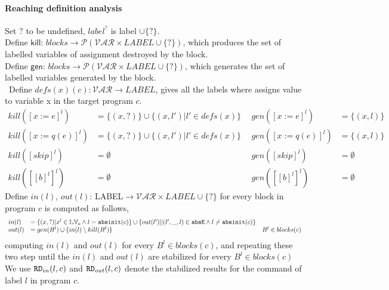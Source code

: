  \paragraph{Reaching definition analysis}
 Set $?$ to be undefined, $label^{?}$ is label $\cup \{?\}$.\\
 Define $\mathsf{kill}$: $blocks \to \mathcal{P}(\mathcal{VAR} \times LABEL \cup \{?\})$, which produces the set of labelled variables of assignment destroyed by the block.
 \\
  Define $\mathsf{gen}$: $blocks \to \mathcal{P}(\mathcal{VAR} \times LABEL \cup \{?\})$, which generates the set of labelled variables generated by the block.
  \\\
  Define $defs(x)(c): \mathcal{VAR} \to LABEL$, gives all the labels where assigns value to variable x in the target program $c$. \[
 \begin{array}{ll}
    kill([x := e]^{l})  & = \{ (x, ?) \} \cup \{ (x, l') | l' \in defs(x) \} \\
     kill([x := q(e)]^{l})  & = \{ (x, ?) \} \cup \{ (x, l') | l' \in defs(x) \}  \\
     kill([skip]^{l})  & = \emptyset \\
     kill([ [b]^l ]^{l})  & =  \emptyset
 \end{array}
 ~~
  \begin{array}{ll}
      gen([x := e]^{l})  & = \{ (x, l) \}  \\
     gen([x := q(e)]^{l})  & = \{ (x, l) \}  \\
     gen([skip]^{l})  & = \emptyset \\
     gen([ [b]^l ]^{l})  & =  \emptyset 
 \end{array}
 \]
 Define $in(l)$, $out(l)$: LABEL$ \to \mathcal{VAR} \times LABEL \cup \{?\}$ for every block in program $c$ is computed as follows,
 \[
 \begin{array}{lll}
    in(l)  & = \{ (x, ?) | x^l \in \mathbb{LV}_c \land  l = \mathtt{abs}{\mathtt{init}}(c) \}  
    \cup \{ out(l')|  | (l',\_, l) \in \mathtt{abs}{\mathtt{E}} \land  l \neq \mathtt{abs}{\mathtt{init}}(c)\}  \\
     out(l)  & =  gen(B^{l}) \cup \{ in(l) \setminus kill(B^l)  \} & B^l \in blocks(c)   
 \end{array}
 \]
 computing $in(l)$ and $out(l)$ for every $B^l \in blocks(c) $, and repeating these two step
until the $in(l)$ and $out(l)$ are stabilized for every $B^l \in blocks(c) $
We use $\mathtt{RD}_{in}(l,c)$ and $\mathtt{RD}_{out}(l, c)$ denote the stabilized results for the command of label $l$ in program $c$. 
\\
